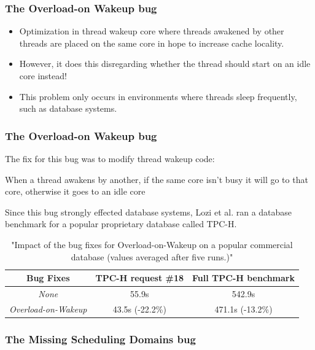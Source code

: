 \documentclass{beamer}
\newcommand{\linespace}{\vskip 0.25cm}
\begin{document}
\begin{frame}
\frametitle{The Overload-on Wakeup bug}
\begin{itemize}
\item Optimization in thread wakeup core where threads awakened by other threads are placed on the same core in hope to increase cache locality.

\linespace

\item However, it does this disregarding whether the thread should start on an idle core instead!	
\end{itemize}

\linespace

\begin{itemize}
\item This problem only occurs in environments where threads sleep frequently, such as database systems.
\end{itemize}

\end{frame}


\begin{frame}
\frametitle{The Overload-on Wakeup bug}
The fix for this bug was to modify thread wakeup code:
\linespace

When a thread awakens by another, if the same core isn't busy it will go to that core, otherwise it goes to an idle core

\linespace

Since this bug strongly effected database systems, Lozi et al. ran a database benchmark for a popular proprietary database called TPC-H.

\begin{table}
	\centering
	\begin{tabular}{| c | c | c |}
		\hline			
	  	Bug Fixes & TPC-H request \#18 & Full TPC-H benchmark \\ \hline
		\emph{None} & 55.9s & 542.9s \\ \hline
		\emph{Overload-on-Wakeup} & 43.5s (-22.2\%) & 471.1s (-13.2\%) \\
		\hline
	\end{tabular}
	\caption{"Impact of the bug fixes for Overload-on-Wakeup on a popular commercial database (values averaged after five runs.)"}
\end{table}

\end{frame}

\begin{frame}
\frametitle{The Missing Scheduling Domains bug}

\linespace


\end{frame}
\end{document}

